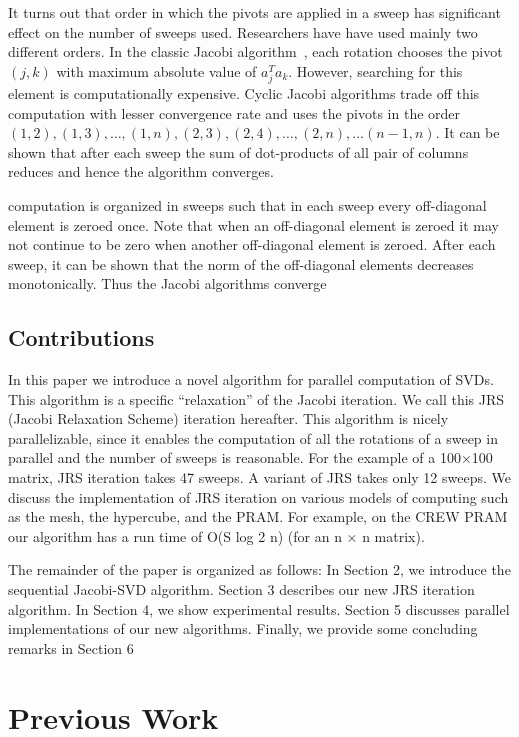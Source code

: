 \documentclass[10pt, conference, compsocconf]{IEEEtran}
\begin{document}
It turns out that order in which the pivots are applied in a sweep has significant effect on the number of sweeps used. Researchers have have used mainly two different orders. In the classic Jacobi algorithm~\cite{golub2012matrix}, each rotation chooses the pivot $(j,k)$ with maximum absolute value of $a_j^{T}a_k$. However, searching for this element is computationally expensive. Cyclic Jacobi algorithms trade off this computation with lesser convergence rate and uses the pivots in the order $(1,2), (1,3), \ldots, (1,n), (2,3), (2,4), \ldots, (2,n), \ldots (n-1,n)$.  It can be shown that after each sweep the sum of dot-products of all pair of columns reduces and hence the algorithm converges. 

 
computation is organized in sweeps such that in each sweep
every off-diagonal element is zeroed once. Note that when an
off-diagonal element is zeroed it may not continue to be zero
when another off-diagonal element is zeroed. After each sweep,
it can be shown that the norm of the off-diagonal elements
decreases monotonically. Thus the Jacobi algorithms converge
\subsection{Contributions}

In this paper we introduce a novel algorithm for parallel computation of SVDs. This algorithm is a specific “relaxation” of the Jacobi iteration. We call this JRS (Jacobi Relaxation Scheme) iteration hereafter. This algorithm is nicely parallelizable, since it enables the computation of all the rotations of a sweep in parallel and the number of sweeps is reasonable. For the example of a 100×100 matrix, JRS iteration takes 47 sweeps. A variant of JRS takes only 12 sweeps.  We discuss the implementation of JRS iteration on various models of computing such as the mesh, the hypercube, and the PRAM. For example, on the CREW PRAM our algorithm has a run time of O(S log 2 n) (for an n × n matrix).

The remainder of the paper is organized as follows: In
Section 2, we introduce the sequential Jacobi-SVD algorithm.
Section 3 describes our new JRS iteration algorithm. In
Section 4, we show experimental results. Section 5 discusses
parallel implementations of our new algorithms. Finally, we
provide some concluding remarks in Section 6

\section{Previous Work}
\end{document}
